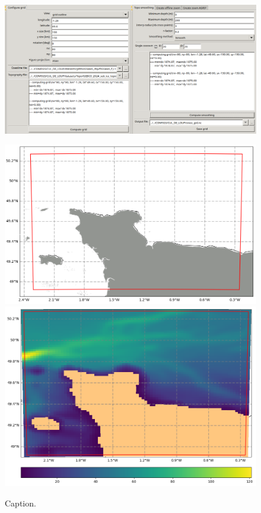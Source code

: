\documentclass[10pt,a4paper,titlepage]{article}
\begin{document}
\begin{figure}
    \begin{center}
        \includegraphics[scale=0.4]{../images/makegrid/parameters_main.png}

        \includegraphics[scale=0.2]{../images/makegrid/config_main.png}
        \includegraphics[scale=0.2]{../images/makegrid/ismooth_main.png}
        \caption{Caption.}
        \label{make_grid_main}
    \end{center}
\end{figure}
\end{document}
